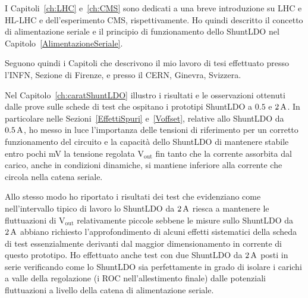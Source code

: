 
I Capitoli~\ref{ch:LHC} e~\ref{ch:CMS} sono dedicati a una breve introduzione su LHC e HL-LHC e dell'esperimento CMS, rispettivamente. Ho quindi descritto il concetto di alimentazione seriale e il principio di funzionamento dello ShuntLDO nel Capitolo~\ref{AlimentazioneSeriale}. 

Seguono quindi i Capitoli che descrivono il mio lavoro di tesi effettuato presso l'INFN, Sezione di Firenze, e presso il CERN, Ginevra, Svizzera.

Nel Capitolo~\ref{ch:caratShuntLDO} illustro i risultati e le osservazioni ottenuti dalle prove sulle schede di test che ospitano i prototipi ShuntLDO a $0.5$ e $2\rm \, A$. 
In particolare nelle Sezioni~\ref{EffettiSpuri} e~\ref{Voffset}, relative allo ShuntLDO da $0.5\rm \, A$, ho messo in luce l'importanza delle tensioni di riferimento per un corretto funzionamento del circuito e la capacità dello ShuntLDO di mantenere stabile entro pochi mV la tensione regolata $\mathrm{V_{out}}$ fin tanto che la corrente assorbita dal carico, anche in condizioni dinamiche, si mantiene inferiore alla corrente che circola nella catena seriale.

Allo stesso modo ho riportato i risultati dei test che evidenziano come nell'intervallo tipico di lavoro lo ShuntLDO da $2\rm \, A$ riesca a mantenere le fluttuazioni di $\mathrm{V_{out}}$ relativamente piccole sebbene le misure sullo ShuntLDO da $2\rm \, A$ abbiano richiesto l'approfondimento di alcuni effetti sistematici della scheda di test essenzialmente derivanti dal maggior dimensionamento in corrente di questo prototipo. Ho effettuato anche test con due ShuntLDO da $2\rm \, A$ posti in serie verificando come lo ShuntLDO sia perfettamente in grado di isolare i carichi a valle della regolazione (i ROC nell'allestimento finale) dalle potenziali fluttuazioni a livello della catena di alimentazione seriale.


